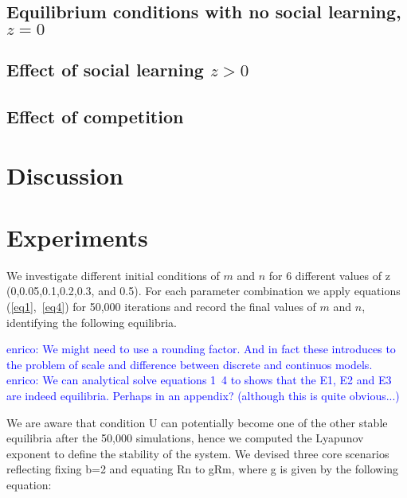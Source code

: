 \documentclass[preprint,authoryear]{elsarticle}
\newcommand{\memo}[2]{\textcolor{#1}{#2}}
\newcommand{\enrico}[1]{\memo{blue}{enrico: #1\\}}
\begin{document}
\subsection{Equilibrium conditions with no social learning, $z=0$}

\subsection{Effect of social learning $z>0$}

\subsection{Effect of competition}

\section{Discussion}



\section{Experiments}

We investigate different initial conditions of $m$ and $n$ for 6 different values of z (0,0.05,0.1,0.2,0.3, and 0.5). For each parameter combination we apply equations (\ref{eq1},~\ref{eq4}) for 50,000 iterations and record the final values of $m$ and $n$, identifying the following equilibria.

\enrico{We might need to use a rounding factor. And in fact these introduces to the problem of scale and difference between discrete and continuos  models.}
\enrico{We can analytical solve equations 1~4 to shows that the E1, E2 and E3 are indeed equilibria. Perhaps in an appendix? (although this is quite obvious...)}

We are aware that condition U can potentially become one of the other stable equilibria after the 50,000 simulations, hence we computed the Lyapunov exponent to define the stability of the system. We devised three core scenarios reflecting fixing b=2 and equating Rn to gRm, where g is given by the following equation:
\end{document}
